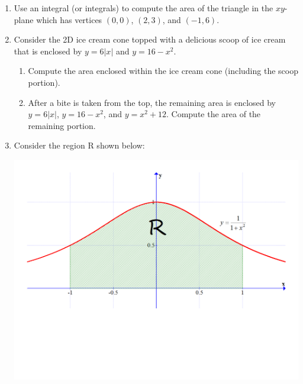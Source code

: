 \documentclass[12pt]{article}
\newif\ifans
\begin{document}
\begin{enumerate}
\begin{enumerate}
\ifans{\fbox{$\int_0^4 \frac{7}{8}y \,dy=7$}} \fi

\end{enumerate}

\item Use an integral (or integrals) to compute the area of the triangle in the $xy$-plane which has vertices $(0,0)$, $(2,3)$, and $(-1,6)$.

\ifans{\fbox{$\frac{15}{2}$}} \fi

\item Consider the 2D ice cream cone topped with a delicious scoop of ice cream that is enclosed by $y=6|x|$ and $y=16-x^2$.

\begin{enumerate}

\item Compute the area enclosed within the ice cream cone (including the scoop portion).

\ifans{\fbox{$\frac{104}{3}$}} \fi

\item After a bite is taken from the top, the remaining area is enclosed by $y=6|x|$, $y=16-x^2$, and $y=x^2+12$.  Compute the area of the remaining portion.

\ifans{\fbox{$\frac{104}{3}-\frac{16\sqrt{2}}{3}$}} \fi

\end{enumerate}

\item Consider the region R shown below:

\begin{center}

\includegraphics[scale=0.3]{area.pdf}


\end{center}
\end{enumerate}
\end{document}
